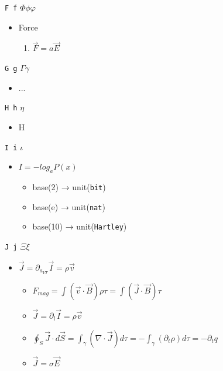 \texttt{F f} $\Phi \phi \varphi$\begin{itemize}

\item Force\begin{enumerate}

\item $\vec F = a \vec E$

\end{enumerate}



\end{itemize}

\texttt{G g} $\Gamma \gamma$\begin{itemize}

\item ...

\end{itemize}

\texttt{H h} $\eta$\begin{itemize}

\item H 

\end{itemize}

\texttt{I i} $\iota$\begin{itemize}

\item $I = - log_a P(x)$\begin{itemize}

\item base(2) → unit(\verb|bit|)

\item base(e) → unit(\verb|nat|)

\item base(10) → unit(\verb|Hartley|)

\end{itemize}



\end{itemize}

\texttt{J j} $\Xi \xi$\begin{itemize}

\item $\vec{J} = \partial_{a_{VT}}\vec{I} = \rho\vec{v}$\begin{itemize}

\item $F_{mag} = \int(\vec{v}\cdot\vec{B})\rho\tau = \int(\vec{J}\cdot\vec{B})\tau$

\item $\vec{J} = \partial_{l}\vec{I} = \rho\vec{v}$

\item $\oint_S \vec{J}\cdot d\vec{S} = \int_\gamma(\nabla \cdot \vec{J})d\tau = -\int_\gamma(\partial_t\rho)d\tau = -\partial_t q$

\item $\vec{J} = \sigma \vec{E}$

\end{itemize}



\end{itemize}

